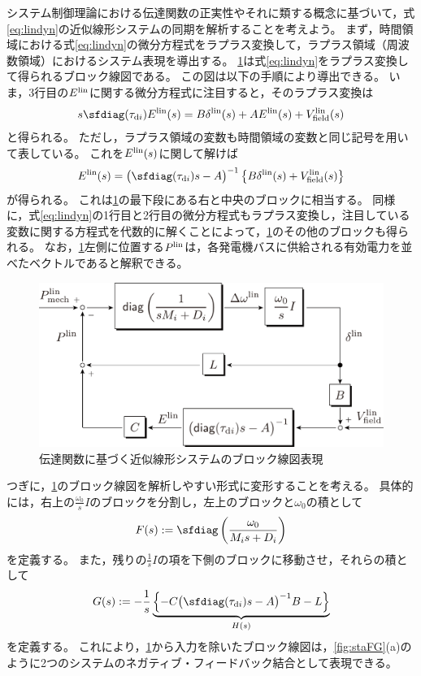 \documentclass[tombow,dvipdfmx]{corona-a5}
\begin{document}
システム制御理論における伝達関数の正実性やそれに類する概念に基づいて，式\ref{eq:lindyn}の近似線形システムの同期を解析することを考えよう。
まず，時間領域における式\ref{eq:lindyn}の微分方程式をラプラス変換して，ラプラス領域（周波数領域）におけるシステム表現を導出する。
\ref{fig:blocklin}は式\ref{eq:lindyn}をラプラス変換して得られるブロック線図である。
この図は以下の手順により導出できる。
いま，3行目の$E^{\rm lin}$に関する微分方程式に注目すると，そのラプラス変換は
\begin{align*}
s \sfdiag(\tau_{{\rm d}i}) E^{\rm lin}(s)
= B \delta^{\rm lin}(s) + A E^{\rm lin}(s) + V^{\rm lin}_{\rm field}(s)
\end{align*}
と得られる。
ただし，ラプラス領域の変数も時間領域の変数と同じ記号を用いて表している。
これを$E^{\rm lin}(s)$に関して解けば
\begin{align*}
E^{\rm lin}(s) = \bigl( \sfdiag(\tau_{{\rm d}i})s -A \bigr)^{-1} 
\left\{ B \delta^{\rm lin}(s)
+ V^{\rm lin}_{\rm field}(s) \right\}
\end{align*}
が得られる。
これは\ref{fig:blocklin}の最下段にある右と中央のブロックに相当する。
同様に，式\ref{eq:lindyn}の1行目と2行目の微分方程式もラプラス変換し，注目している変数に関する方程式を代数的に解くことによって，\ref{fig:blocklin}のその他のブロックも得られる。
なお，\ref{fig:blocklin}左側に位置する$P^{\rm lin}$は，各発電機バスに供給される有効電力を並べたベクトルであると解釈できる。

\begin{figure}[t]
\centering
\includegraphics[width = .50\linewidth]{figs/blocklinsys2}
\caption{伝達関数に基づく近似線形システムのブロック線図表現}
\label{fig:blocklin}
\end{figure}




つぎに，\ref{fig:blocklin}のブロック線図を解析しやすい形式に変形することを考える。
具体的には，右上の$\frac{\omega_0}{s}I$のブロックを分割し，左上のブロックと$\omega_0$の積として
\begin{align}\label{eq:trFs}
F(s) :=  
\sfdiag \left( 
\frac{\omega_0}{M_i s + D_i}
\right)
\end{align}
を定義する。
また，残りの$\frac{1}{s}I$の項を下側のブロックに移動させ，それらの積として
\begin{align}\label{eq:trGs}
G(s) :=  - \frac{1}{s} 
\underbrace{
\left\{ -C \bigl( \sfdiag(\tau_{{\rm d}i})s -A \bigr)^{-1} B - L \right\}
}_{H(s)}
\end{align}
を定義する。
これにより，\ref{fig:blocklin}から入力を除いたブロック線図は，\ref{fig:staFG}(a)のように2つのシステムのネガティブ・フィードバック結合として表現できる。
\end{document}
